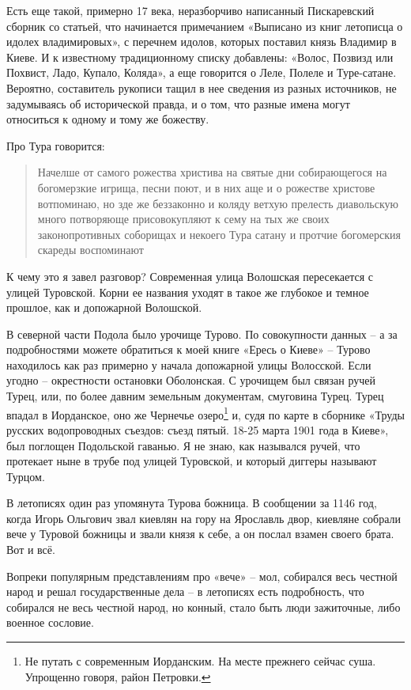 \documentclass[a5paper,11pt,openany]{article}
\begin{document}
Есть еще такой, примерно 17 века, неразборчиво написанный Пискаревский сборник со статьей, что начинается примечанием «Выписано из книг летописца о идолех владимировых», с перечнем идолов, которых поставил князь Владимир в Киеве. И к известному традиционному списку добавлены: «Волос, Позвизд или Похвист, Ладо, Купало, Коляда», а еще говорится о Леле, Полеле и Туре-сатане. Вероятно, составитель рукописи тащил в нее сведения из разных источников, не задумываясь об исторической правда, и о том, что разные имена могут относиться к одному и тому же божеству. 

   Про Тура говорится: 

\begin{quotation}
\noindent Начелше от самого рожества христива на святые дни собирающегося на богомерзкие игрища, песни поют, и в них аще и о рожестве христове вотпоминаю, но зде же беззаконно и коляду ветхую прелесть диавольскую много потворяюще присовокупляют к сему на тых же своих законопротивных соборищах и некоего Тура сатану и протчие богомерския скареды воспоминают
\end{quotation}

    К чему это я завел разговор? Современная улица Волошская пересекается с улицей Туровской. Корни ее названия уходят в такое же глубокое и темное прошлое, как и допожарной Волошской.

   В северной части Подола было урочище Турово. По совокупности данных – а за подробностями можете обратиться к моей книге «Ересь о Киеве»\cite{eres} – Турово находилось как раз примерно у начала допожарной улицы Волосской. Если угодно – окрестности остановки Оболонская. С урочищем был связан ручей Турец, или, по более давним земельным документам, смуговина Турец. Турец впадал в Иорданское, оно же Чернечье озеро\footnote{Не путать с современным Иорданским. На месте прежнего сейчас суша. Упрощенно говоря, район Петровки.} и, судя по карте в сборнике «Труды русских водопроводных съездов: съезд пятый. 18-25 марта 1901 года в Киеве», был поглощен Подольской гаванью. Я не знаю, как назывался ручей, что протекает ныне в трубе под улицей Туровской, и который диггеры называют Турцом.

  В летописях один раз упомянута Турова божница. В сообщении за 1146 год, когда Игорь Ольгович звал киевлян на гору на Ярославль двор, киевляне собрали вече у Туровой  божницы и звали князя к себе, а он послал взамен своего брата. Вот и всё.

   Вопреки популярным представлениям про «вече» – мол, собирался весь честной народ и решал государственные дела – в летописях есть подробность, что собирался не весь честной народ, но конный, стало быть люди зажиточные, либо военное сословие.
\end{document}
